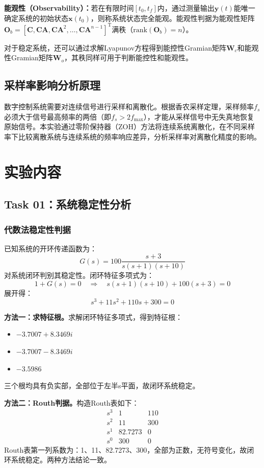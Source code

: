 \documentclass{../common/SCNU_Experimental_Report}
\begin{document}
\textbf{能观性（Observability）：}若在有限时间$[t_0, t_f]$内，通过测量输出$\boldsymbol{y}(t)$能唯一确定系统的初始状态$\boldsymbol{x}(t_0)$，则称系统状态完全能观。能观性判据为能观性矩阵$\boldsymbol{O}_b = [\boldsymbol{C}, \boldsymbol{CA}, \boldsymbol{CA}^2, \ldots, \boldsymbol{CA}^{n-1}]^\mathrm{T}$满秩（$\text{rank}(\boldsymbol{O}_b) = n$）。

对于稳定系统，还可以通过求解Lyapunov方程得到能控性Gramian矩阵$\boldsymbol{W}_c$和能观性Gramian矩阵$\boldsymbol{W}_o$，其秩同样可用于判断能控性和能观性。

\subsection{采样率影响分析原理}
数字控制系统需要对连续信号进行采样和离散化。根据香农采样定理，采样频率$f_s$必须大于信号最高频率的两倍（即$f_s > 2f_{\max}$），才能从采样信号中无失真地恢复原始信号。本实验通过零阶保持器（ZOH）方法将连续系统离散化，在不同采样率下比较离散系统与连续系统的频率响应差异，分析采样率对离散化精度的影响。

\section{实验内容}
\subsection{Task 01：系统稳定性分析}

\subsubsection{代数法稳定性判据}
已知系统的开环传递函数为：
\[
G(s) = 100\frac{s + 3}{s(s + 1)(s + 10)}
\]
对系统闭环判别其稳定性。闭环特征多项式为：
\[
1 + G(s) = 0 \quad \Longrightarrow \quad s(s+1)(s+10) + 100(s+3) = 0
\]
展开得：
\[
s^3 + 11s^2 + 110s + 300 = 0
\]

\textbf{方法一：求特征根。}求解闭环特征多项式，得到特征根：
\begin{itemize}
    \item $-3.7007 + 8.3469i$
    \item $-3.7007 - 8.3469i$
    \item $-3.5986$
\end{itemize}
三个根均具有负实部，全部位于左半s平面，故闭环系统稳定。

\textbf{方法二：Routh判据。}构造Routh表如下：
\[
\begin{array}{c|cc}
s^3 & 1 & 110 \\
s^2 & 11 & 300 \\
s^1 & 82.7273 & 0 \\
s^0 & 300 & 0
\end{array}
\]
Routh表第一列系数为：1、11、82.7273、300，全部为正数，无符号变化，故闭环系统稳定。两种方法结论一致。
\end{document}
